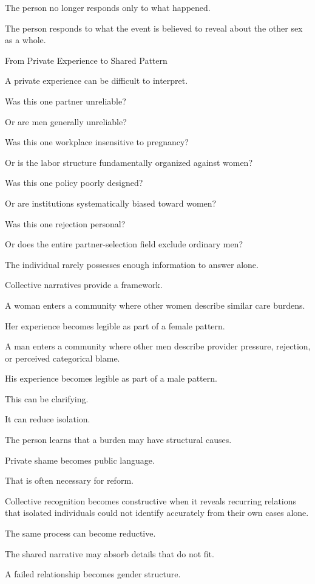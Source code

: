 The person no longer responds only to what happened.

The person responds to what the event is believed to reveal about the other sex as a whole.

From Private Experience to Shared Pattern

A private experience can be difficult to interpret.

Was this one partner unreliable?

Or are men generally unreliable?

Was this one workplace insensitive to pregnancy?

Or is the labor structure fundamentally organized against women?

Was this one policy poorly designed?

Or are institutions systematically biased toward women?

Was this one rejection personal?

Or does the entire partner-selection field exclude ordinary men?

The individual rarely possesses enough information to answer alone.

Collective narratives provide a framework.

A woman enters a community where other women describe similar care burdens.

Her experience becomes legible as part of a female pattern.

A man enters a community where other men describe provider pressure, rejection, or perceived categorical blame.

His experience becomes legible as part of a male pattern.

This can be clarifying.

It can reduce isolation.

The person learns that a burden may have structural causes.

Private shame becomes public language.

That is often necessary for reform.

Collective recognition becomes constructive when it reveals recurring relations that isolated individuals could not identify accurately from their own cases alone.

The same process can become reductive.

The shared narrative may absorb details that do not fit.

A failed relationship becomes gender structure.

